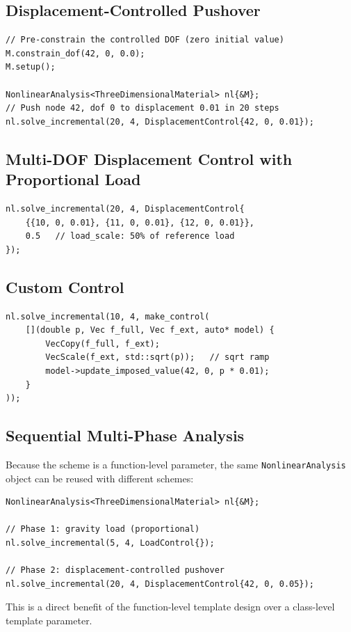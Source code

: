 \subsection{Displacement-Controlled Pushover}

\begin{lstlisting}
// Pre-constrain the controlled DOF (zero initial value)
M.constrain_dof(42, 0, 0.0);
M.setup();

NonlinearAnalysis<ThreeDimensionalMaterial> nl{&M};
// Push node 42, dof 0 to displacement 0.01 in 20 steps
nl.solve_incremental(20, 4, DisplacementControl{42, 0, 0.01});
\end{lstlisting}

\subsection{Multi-DOF Displacement Control with Proportional Load}

\begin{lstlisting}
nl.solve_incremental(20, 4, DisplacementControl{
    {{10, 0, 0.01}, {11, 0, 0.01}, {12, 0, 0.01}},
    0.5   // load_scale: 50% of reference load
});
\end{lstlisting}

\subsection{Custom Control}

\begin{lstlisting}
nl.solve_incremental(10, 4, make_control(
    [](double p, Vec f_full, Vec f_ext, auto* model) {
        VecCopy(f_full, f_ext);
        VecScale(f_ext, std::sqrt(p));   // sqrt ramp
        model->update_imposed_value(42, 0, p * 0.01);
    }
));
\end{lstlisting}

\subsection{Sequential Multi-Phase Analysis}

Because the scheme is a function-level parameter, the same
\texttt{NonlinearAnalysis} object can be reused with different
schemes:

\begin{lstlisting}
NonlinearAnalysis<ThreeDimensionalMaterial> nl{&M};

// Phase 1: gravity load (proportional)
nl.solve_incremental(5, 4, LoadControl{});

// Phase 2: displacement-controlled pushover
nl.solve_incremental(20, 4, DisplacementControl{42, 0, 0.05});
\end{lstlisting}

This is a direct benefit of the function-level template design
over a class-level template parameter.
